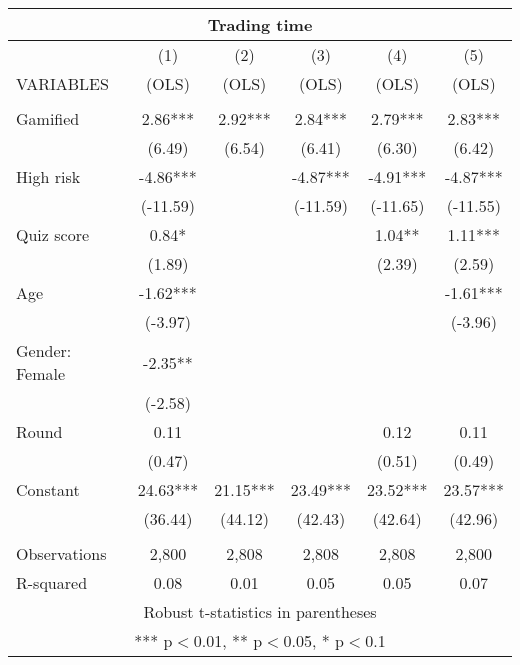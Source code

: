 \documentclass[]{article}
\begin{document}
\begin{tabular}{lccccc}
\multicolumn{6}{c}{Trading time} \\ \hline
 & (1) & (2) & (3) & (4) & (5) \\
VARIABLES & (OLS) & (OLS) & (OLS) & (OLS) & (OLS) \\ \hline
 &  &  &  &  &  \\
Gamified & 2.86*** & 2.92*** & 2.84*** & 2.79*** & 2.83*** \\
 & (6.49) & (6.54) & (6.41) & (6.30) & (6.42) \\
High risk & -4.86*** &  & -4.87*** & -4.91*** & -4.87*** \\
 & (-11.59) &  & (-11.59) & (-11.65) & (-11.55) \\
Quiz score & 0.84* &  &  & 1.04** & 1.11*** \\
 & (1.89) &  &  & (2.39) & (2.59) \\
Age & -1.62*** &  &  &  & -1.61*** \\
 & (-3.97) &  &  &  & (-3.96) \\
Gender: Female & -2.35** &  &  &  &  \\
 & (-2.58) &  &  &  &  \\
Round & 0.11 &  &  & 0.12 & 0.11 \\
 & (0.47) &  &  & (0.51) & (0.49) \\
Constant & 24.63*** & 21.15*** & 23.49*** & 23.52*** & 23.57*** \\
 & (36.44) & (44.12) & (42.43) & (42.64) & (42.96) \\
 &  &  &  &  &  \\
Observations & 2,800 & 2,808 & 2,808 & 2,808 & 2,800 \\
 R-squared & 0.08 & 0.01 & 0.05 & 0.05 & 0.07 \\ \hline
\multicolumn{6}{c}{ Robust t-statistics in parentheses} \\
\multicolumn{6}{c}{ *** p$<$0.01, ** p$<$0.05, * p$<$0.1} \\
\end{tabular}
\end{document}
